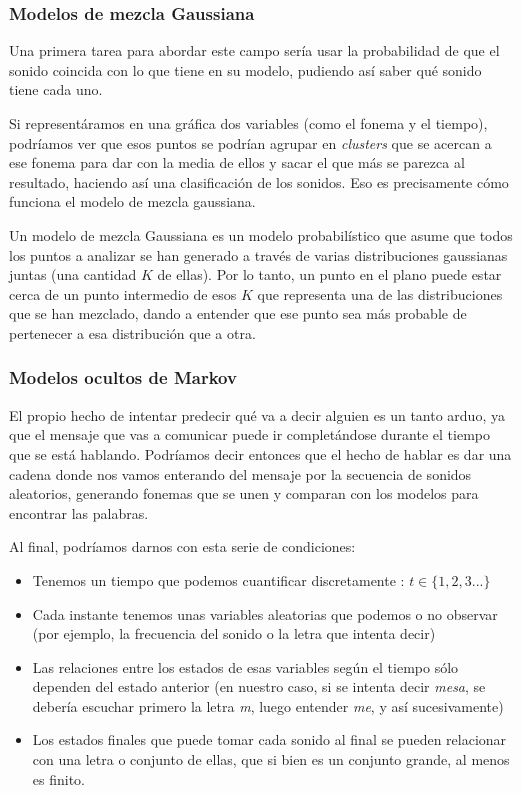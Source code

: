\subsubsection{Modelos de mezcla Gaussiana}
Una primera tarea para abordar este campo sería usar la probabilidad de que el sonido coincida con lo que tiene en su modelo, pudiendo así saber qué sonido tiene cada uno.

Si representáramos en una gráfica dos variables (como el fonema y el tiempo), podríamos ver que esos puntos se podrían agrupar en \textit{clusters} que se acercan a ese fonema para dar con la media de ellos y sacar el que más se parezca al resultado, haciendo así una clasificación de los sonidos. Eso es precisamente cómo funciona el modelo de mezcla gaussiana.

Un modelo de mezcla Gaussiana es un modelo probabilístico que asume que todos los puntos a analizar se han generado a través de varias distribuciones gaussianas juntas (una cantidad $K$ de ellas). Por lo tanto, un punto en el plano puede estar cerca de un punto intermedio de esos $K$ que representa una de las distribuciones que se han mezclado, dando a entender que ese punto sea más probable de pertenecer a esa distribución que a otra.

\subsubsection{Modelos ocultos de Markov}

El propio hecho de intentar predecir qué va a decir alguien es un tanto arduo, ya que el mensaje que vas a comunicar puede ir completándose durante el tiempo que se está hablando. Podríamos decir entonces que el hecho de hablar es dar una cadena donde nos vamos enterando del mensaje por la secuencia de sonidos aleatorios, generando fonemas que se unen y comparan con los modelos para encontrar las palabras.

Al final, podríamos darnos con esta serie de condiciones:
\begin{itemize}
	\item Tenemos un tiempo que podemos cuantificar discretamente : $ t \in \{1,2,3...\} $
	\item Cada instante tenemos unas variables aleatorias que podemos o no observar (por ejemplo, la frecuencia del sonido o la letra que intenta decir)
	\item Las relaciones entre los estados de esas variables según el tiempo sólo dependen del estado anterior (en nuestro caso, si se intenta decir \textit{mesa}, se debería escuchar primero la letra \textit{m}, luego entender \textit{me}, y así sucesivamente)
	\item Los estados finales que puede tomar cada sonido al final se pueden relacionar con una letra o conjunto de ellas, que si bien es un conjunto grande, al menos es finito.
\end{itemize}

